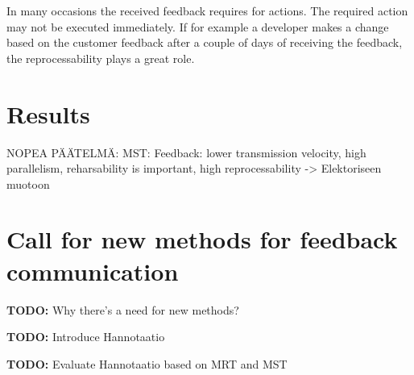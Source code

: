 \documentclass[conference]{IEEEtran}
\begin{document}
In many occasions the received feedback requires for actions. The required action may not be executed immediately. If for example a developer makes a change based on the customer feedback after a couple of days of receiving the feedback, the reprocessability plays a great role.

\section{Results}

NOPEA PÄÄTELMÄ: MST: Feedback: lower transmission velocity, high parallelism, reharsability is important, high reprocessability -> Elektoriseen muotoon


\section{Call for new methods for feedback communication}

\textbf{TODO:} Why there's a need for new methods?

\textbf{TODO:} Introduce Hannotaatio

\textbf{TODO:} Evaluate Hannotaatio based on MRT and MST

%
%

\end{document}
